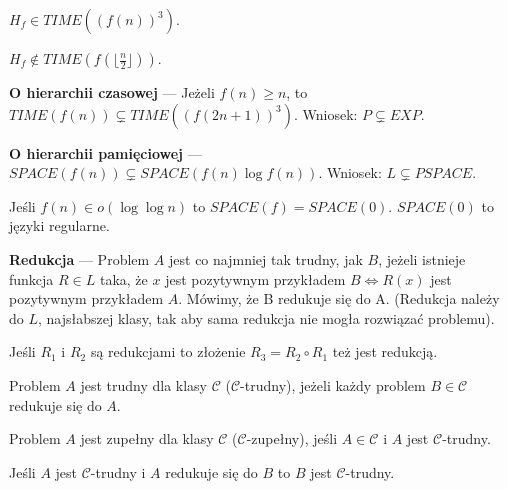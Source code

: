 \begin{lemat}
    $H_f \in TIME((f(n))^3)$.
\end{lemat}

\begin{lemat}
    $H_f \notin TIME(f(\lfloor \frac{n}{2} \rfloor))$.
\end{lemat}

\begin{twierdzenie}
    \textbf{O hierarchii czasowej} --- Jeżeli $f(n) \geq n$, to $TIME(f(n)) \subsetneq TIME((f(2n + 1))^3)$. Wniosek: $P \subsetneq EXP$.
\end{twierdzenie}

\begin{twierdzenie}
    \textbf{O hierarchii pamięciowej} --- $SPACE(f(n)) \subsetneq SPACE(f(n) \log f(n))$. Wniosek: $L \subsetneq PSPACE$.
\end{twierdzenie}

\begin{twierdzenie}
    Jeśli $f(n) \in o(\log \log n)$ to $SPACE(f) = SPACE(0)$. $SPACE(0)$ to języki regularne.
\end{twierdzenie}

\begin{definicja}
    \textbf{Redukcja} --- Problem $A$ jest co najmniej tak trudny, jak $B$, jeżeli istnieje funkcja $R \in L$ taka, że $x$ jest pozytywnym przykładem $B \iff R(x)$ jest pozytywnym przykładem $A$. Mówimy, że B redukuje się do A. (Redukcja należy do $L$, najsłabszej klasy, tak aby sama redukcja nie mogła rozwiązać problemu).
\end{definicja}

\begin{lemat}
    Jeśli $R_1$ i $R_2$ są redukcjami to złożenie $R_3 = R_2 \circ R_1$ też jest redukcją. 
\end{lemat}

\begin{definicja}
    Problem $A$ jest trudny dla klasy $\mathcal{C}$ ($\mathcal{C}$-trudny), jeżeli każdy problem $B \in \mathcal{C}$ redukuje się do $A$.
\end{definicja}

\begin{definicja}
    Problem $A$ jest zupełny dla klasy $\mathcal{C}$ ($\mathcal{C}$-zupełny), jeśli $A \in \mathcal{C}$ i $A$ jest $\mathcal{C}$-trudny.
\end{definicja}

\begin{lemat}
    Jeśli $A$ jest $\mathcal{C}$-trudny i $A$ redukuje się do $B$ to $B$ jest $\mathcal{C}$-trudny.
\end{lemat}

